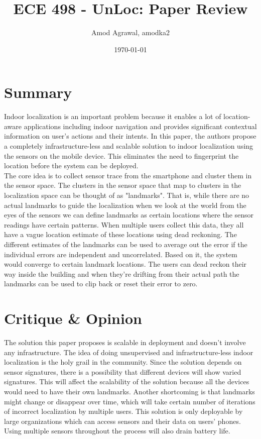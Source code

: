 \documentclass[a4paper]{article}
\title{ECE 498 - UnLoc: Paper Review}
\author{Amod Agrawal, amodka2}
\date{\today}
\begin{document}
\maketitle
\section{Summary}
Indoor localization is an important problem because it enables a lot of location-aware applications including indoor navigation and provides significant contextual information on user's actions and their intents. In this paper, the authors propose a completely infrastructure-less and scalable solution to indoor localization using the sensors on the mobile device. This eliminates the need to fingerprint the location before the system can be deployed.\\

The core idea is to collect sensor trace from the smartphone and cluster them in the sensor space. The clusters in the sensor space that map to clusters in the localization space can be thought of as "landmarks". That is, while there are no actual landmarks to guide the localization when we look at the world from the eyes of the sensors we can define landmarks as certain locations where the sensor readings have certain patterns. When multiple users collect this data, they all have a vague location estimate of these locations using dead reckoning. The different estimates of the landmarks can be used to average out the error if the individual errors are independent and uncorrelated. Based on it, the system would converge to certain landmark locations. The users can dead reckon their way inside the building and when they're drifting from their actual path the landmarks can be used to clip back or reset their error to zero. \\

\section{Critique \& Opinion}
	
The solution this paper proposes is scalable in deployment and doesn't involve any infrastructure. The idea of doing unsupervised and infrastructure-less indoor localization is the holy grail in the community. Since the solution depends on sensor signatures, there is a possibility that different devices will show varied signatures. This will affect the scalability of the solution because all the devices would need to have their own landmarks. Another shortcoming is that landmarks might change or disappear over time, which will take certain number of iterations of incorrect localization by multiple users. This solution is only deployable by large organizations which can access sensors and their data on users' phones. Using multiple sensors throughout the process will also drain battery life.\\
\end{document}
